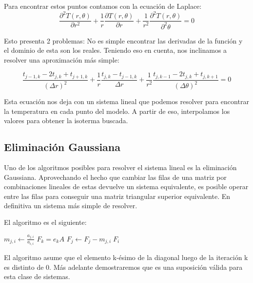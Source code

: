\documentclass[12pt,a4paper]{article}
\begin{document}
Para encontrar estos puntos contamos con la ecuación de Laplace:
\begin{equation}
	\frac{{\partial}^2T(r,\theta)}{\partial r^2} + \frac{1}{r} \frac{\partial T(r,\theta)}{\partial r} + \frac{1}{r^2} \frac{{\partial}^2T(r,\theta)}{{\partial}^2 \theta} = 0
\end{equation}


Esto presenta 2 problemas: No es simple encontrar las derivadas de la función y el dominio de esta son los reales. Teniendo eso en cuenta, nos inclinamos a resolver una aproximación más simple:

\begin{equation}
	\frac{t_{j-1,k} -2t_{j,k} + t_{j+1,k}}{(\Delta r)^2} + \frac{1}{r} \frac{t_{j,k}-t_{j-1,k}}{\Delta r} + \frac{1}{r^2} \frac{t_{j,k-1} -2t_{j,k} + t_{j,k+1}}{(\Delta \theta)^2} = 0
\end{equation}

Esta ecuación nos deja con un sistema lineal que podemos resolver para encontrar la temperatura en cada punto del modelo. A partir de eso, interpolamos los valores para obtener la isoterma buscada.

\subsection{Eliminación Gaussiana}
Uno de los algoritmos posibles para resolver el sistema lineal es la eliminación Gaussiana. Aprovechando el hecho que cambiar las filas de una matriz por combinaciones lineales de estas devuelve un sistema equivalente, es posible operar entre las filas para conseguir una matriz triangular superior equivalente. En definitiva un sistema más simple de resolver.

El algoritmo es el siguiente:
\begin{algorithmic}

    
    \State $m_{j,i} \gets \frac{a_{j,i}}{a_{i,i}}$
    \Comment $F_k = e_k A$
    \State $F_j \gets F_j - m_{j,i} \; F_i$
    
    \EndFor
  \EndFor
\EndProcedure
\end{algorithmic}

El algoritmo asume que el elemento k-ésimo de la diagonal luego de la iteración k es distinto de 0. Más adelante demostraremos que es una suposición válida para esta clase de sistemas.
\end{document}
